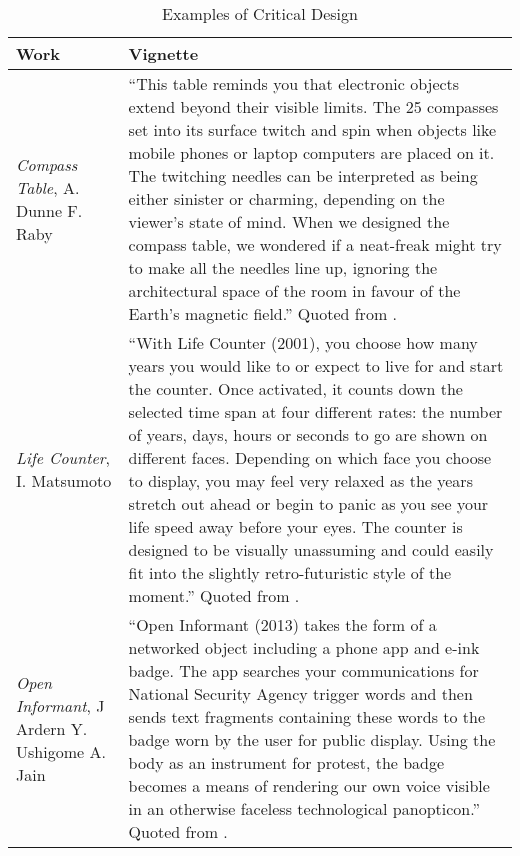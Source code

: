 
\begin{table*}
\centering
\caption{Examples of Critical Design\label{tab:examples}}
\begin{tabular}{|p{3.5cm}|p{13cm}|} 
\hline

Work & Vignette \\ \hline

\textit{Compass Table}, \newline A. Dunne \newline F. Raby &
``This table reminds you that electronic objects extend beyond their visible limits. The 25 compasses set into its surface twitch and spin when objects like mobile phones or laptop computers are placed on it. The twitching needles can be interpreted as being either sinister or charming, depending on the viewer's state of mind. When we designed the compass table, we wondered if a neat-freak might try to make all the needles line up, ignoring the architectural space of the room in favour of the Earth's magnetic field.'' Quoted from \cite{DuRa01}. \\ \hline

\textit{Life Counter}, \newline I. Matsumoto &
``With Life Counter (2001), you choose how many years you would like to or expect to live for and start the counter. Once activated, it counts down the selected time span at four different rates: the number of years, days, hours or seconds to go are shown on different faces. Depending on which face you choose to display, you may feel very relaxed as the years stretch out ahead or begin to panic as you see your life speed away before your eyes. The counter is designed to be visually unassuming and could easily fit into the slightly retro-futuristic style of the moment.'' Quoted from \cite{DuRa01}. \\ \hline

\textit{Open Informant}, \newline J Ardern \newline Y. Ushigome \newline A. Jain &
``Open Informant (2013) takes the form of a networked object including a phone app and e-ink badge. The app searches your communications for National Security Agency trigger words and then sends text fragments containing these words to the badge worn by the user for public display. Using the body as an instrument for protest, the badge becomes a means of rendering our own voice visible in an otherwise faceless technological panopticon.'' Quoted from \cite{Mal17}. \\ \hline

\end{tabular}
\end{table*}